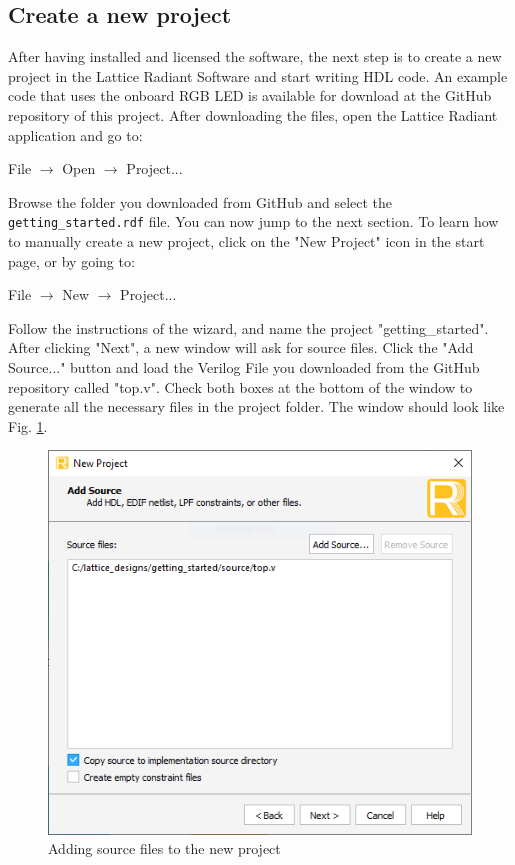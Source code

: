 \documentclass[11pt, a4paper, oneside]{article}
\begin{document}
\subsection{Create a new project}
After having installed and licensed the software, the next step is to create a new project in the Lattice Radiant Software and start writing HDL code. An example code that uses the onboard RGB LED is available for download at the GitHub repository of this project. After downloading the files, open the Lattice Radiant application and go to:
\begin{center}
	File $\rightarrow$ Open $\rightarrow$ Project...
\end{center}
Browse the folder you downloaded from GitHub and select the \texttt{getting\_started.rdf} file. You can now jump to the next section. To learn how to manually create a new project, click on the "New Project" icon in the start page, or by going to:
\begin{center}
	File $\rightarrow$ New $\rightarrow$ Project...
\end{center}
Follow the instructions of the wizard, and name the project "getting\_started". After clicking "Next", a new window will ask for source files. Click the "Add Source..." button and load the Verilog File you downloaded from the GitHub repository called "top.v". Check both boxes at the bottom of the window to generate all the necessary files in the project folder. The window should look like Fig. \ref{fig2}.
%
\begin{figure}[h!]
	\centering
	\includegraphics[scale=0.8]{figs/fig2.png}
	\caption{Adding source files to the new project}
	\label{fig2}
\end{figure}
\end{document}
